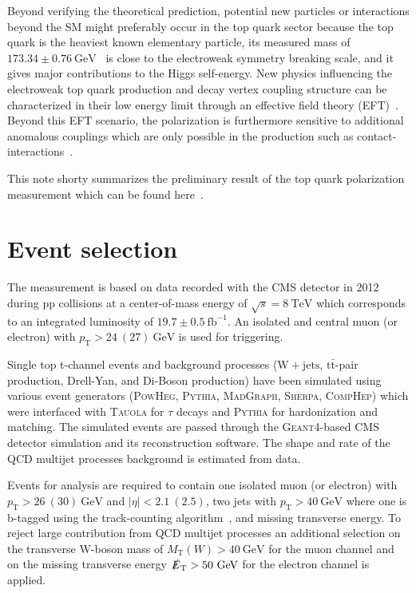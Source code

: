 \documentclass[a4paper]{jpconf}
\newcommand{\unit}[1]{\ensuremath{\mathrm{~#1}}}
\newcommand{\wjets}[0]{\mathrm{W+jets}}
\newcommand{\ttbar}[0]{\ensuremath{\mathrm{t\bar{t}}}}
\newcommand{\pT}[0]{\ensuremath{p_\mathrm{T}}}
\newcommand{\mtw}[0]{\ensuremath{M_\mathrm{T}(W)}}
\newcommand{\met}[0]{\ensuremath{\slashed E_\mathrm{T}}}
\begin{document}
Beyond verifying the theoretical prediction, potential new particles or interactions beyond the SM might preferably occur in the top quark sector because the top quark is the heaviest known elementary particle, its measured mass of $173.34\pm 0.76\unit{GeV}$~\cite{topmass} is close to the electroweak symmetry breaking scale, and it gives major contributions to the Higgs self-energy. New physics influencing the electroweak top quark production and decay vertex coupling structure can be characterized in their low energy limit through an effective field theory (EFT)~\cite{jaaswpol}. Beyond this EFT scenario, the polarization is furthermore sensitive to additional anomalous couplings which are only possible in the production such as contact-interactions~\cite{fabian}.


This note shorty summarizes the preliminary result of the top quark polarization measurement which can be found here~\cite{stpol}.


\section{Event selection}
The measurement is based on data recorded with the CMS detector in 2012 during pp collisions at a center-of-mass energy of $\sqrt{s}=8\unit{TeV}$ which corresponds to an integrated luminosity of $19.7\pm0.5\unit{fb^{-1}}$. An isolated and central muon (or electron) with $\pT>24~(27)\unit{GeV}$ is used for triggering.


Single top t-channel events and background processes ($\wjets$, $\ttbar$-pair production, Drell-Yan, and Di-Boson production) have been simulated using various event generators (\textsc{PowHeg}, \textsc{Pythia}, \textsc{MadGraph}, \textsc{Sherpa}, \textsc{CompHep}) which were interfaced with \textsc{Tauola} for $\tau$ decays and \textsc{Pythia} for hardonization and matching. The simulated events are passed through the \textsc{Geant4}-based CMS detector simulation and its reconstruction software. The shape and rate of the QCD multijet processes background is estimated from data.


Events for analysis are required to contain one isolated muon (or electron) with $\pT>26~(30)\unit{GeV}$ and $|\eta|<2.1~(2.5)$, two jets with $\pT>40\unit{GeV}$ where one is b-tagged using the track-counting algorithm~\cite{tc}, and missing transverse energy. To reject large contribution from QCD multijet processes an additional selection on the transverse W-boson mass of $\mtw>40\unit{GeV}$ for the muon channel and on the missing transverse energy $\met>50\unit{GeV}$ for the electron channel is applied. 
\end{document}
